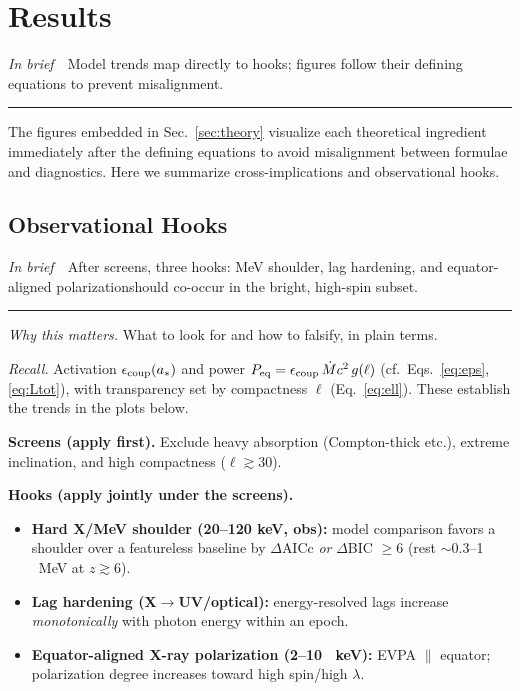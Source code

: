 \documentclass[twocolumn]{aastex701}
\newcommand{\ellcrit}{30}
\newenvironment{titemize}{%
  \begin{itemize}\setlength{\itemsep}{0pt}\setlength{\parsep}{0pt}\setlength{\parskip}{0pt}%
}{\end{itemize}}
\DeclareRobustCommand{\tldr}[1]{%
  \noindent\textit{In brief}\ \textemdash\ #1%
  \par\smallskip
  \noindent\rule{\columnwidth}{0.2pt}\par\medskip
}
\begin{document}
\section{Results}\label{sec:results}
\tldr{Model trends map directly to hooks; figures follow their defining equations to prevent misalignment.}


The figures embedded in Sec.~\ref{sec:theory} visualize each theoretical ingredient immediately after the defining equations to avoid misalignment between formulae and diagnostics. Here we summarize cross-implications and observational hooks.

\clearpage
\subsection{Observational Hooks}\label{sec:obs}
\tldr{After screens, three hooks: MeV shoulder, lag hardening, and equator-aligned polarization\textemdash{}should co-occur in the bright, high-spin subset.}
\suppressfloats[t]  %

\noindent\textit{Why this matters.} What to look for and how to falsify, in plain terms.

\noindent\textit{Recall.}
Activation $\epsilon_{\rm coup}(a_\ast)$ and power $P_{\rm eq}=\epsilon_{\rm coup}\,\dot{M}c^2\,g(\ell)$
(cf.\ Eqs.~\eqref{eq:eps}, \eqref{eq:Ltot}), with transparency set by compactness $\ell$ (Eq.~\eqref{eq:ell}).
These establish the trends in the plots below.

\noindent\textbf{Screens (apply first).}
Exclude heavy absorption (Compton-thick etc.), extreme inclination, and high compactness ($\ell\gtrsim\ellcrit$).

\noindent\textbf{Hooks (apply jointly under the screens).}
\begin{titemize}
  \item \textbf{Hard X/MeV shoulder (20--120 keV, obs):}
        model comparison favors a shoulder over a featureless baseline by
        $\Delta$AICc \emph{or} $\Delta$BIC $\ge 6$
        (rest $\sim$0.3--1 ~MeV at $z\gtrsim6$).
  \item \textbf{Lag hardening (X$\to$UV/optical):}
        energy-resolved lags increase \emph{monotonically} with photon energy within an epoch.
  \item \textbf{Equator-aligned X-ray polarization (2--10 ~keV):}
        EVPA $\parallel$ equator; polarization degree increases toward high spin/high $\lambda$.
\end{titemize}
\end{document}
